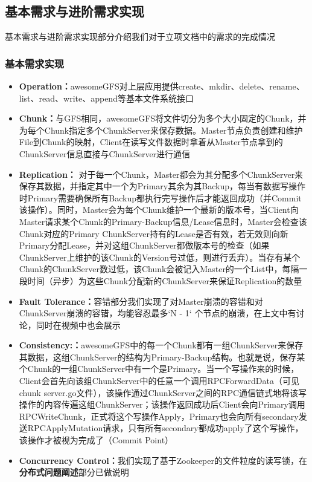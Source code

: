 \documentclass[UTF8]{ctexart}
\begin{document}
\subsection{基本需求与进阶需求实现}
基本需求与进阶需求实现部分介绍我们对于立项文档中的需求的完成情况
\subsubsection{基本需求实现}
\begin{itemize}
\item \textbf{Operation：}awesomeGFS对上层应用提供create、mkdir、delete、rename、list、read、write、append等基本文件系统接口
\item \textbf{Chunk：}与GFS相同，awesomeGFS将文件切分为多个大小固定的Chunk，并为每个Chunk指定多个ChunkServer来保存数据。Master节点负责创建和维护File到Chunk的映射，Client在读写文件数据时拿着从Master节点拿到的ChunkServer信息直接与ChunkServer进行通信
\item \textbf{Replication：} 对于每一个Chunk，Master都会为其分配多个ChunkServer来保存其数据，并指定其中一个为Primary其余为其Backup，每当有数据写操作时Primary需要确保所有Backup都执行完写操作后才能返回成功（并Commit该操作）。同时，Master会为每个Chunk维护一个最新的版本号，当Client向Master请求某个Chunk的Primary-Backup信息/Lease信息时，Master会检查该Chunk对应的Primary ChunkServer持有的Lease是否有效，若无效则向新Primary分配Lease，并对这组ChunkServer都做版本号的检查（如果ChunkServer上维护的该Chunk的Version号过低，则进行丢弃）。当存有某个Chunk的ChunkServer数过低，该Chunk会被记入Master的一个List中，每隔一段时间（异步）为这些Chunk分配新的ChunkServer来保证Replication的数量
\item \textbf{Fault Tolerance：}容错部分我们实现了对Master崩溃的容错和对ChunkServer崩溃的容错，均能容忍最多`N - 1` 个节点的崩溃，在上文中有讨论，同时在视频中也会展示
\item \textbf{Consistency:：}awesomeGFS中的每一个Chunk都有一组ChunkServer来保存其数据，这组ChunkServer的结构为Primary-Backup结构。也就是说，保存某个Chunk的一组ChunkServer中有一个是Primary。当一个写操作来的时候，Client会首先向该组ChunkServer中的任意一个调用RPCForwardData（可见chunk server.go文件），该操作通过ChunkServer之间的RPC通信链式地将该写操作的内容传遍这组ChunkServer；该操作返回成功后Client会向Primary调用RPCWriteChunk，正式将这个写操作Apply，Primary也会向所有secondary发送RPCApplyMutation请求，只有所有secondary都成功apply了这个写操作，该操作才被视为完成了（Commit Point）
\item \textbf{Concurrency Control：}我们实现了基于Zookeeper的文件粒度的读写锁，在\textbf{分布式问题阐述}部分已做说明

\end{itemize}
\end{document}
